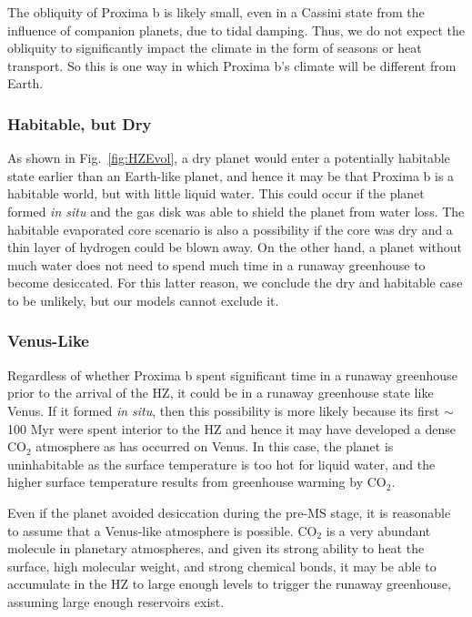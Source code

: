 \documentclass[preprint,12pt]{aastex}
\begin{document}
The obliquity of Proxima b is likely small, even in a Cassini state 
from the influence of companion
planets, due to tidal damping. Thus, we do not expect the 
obliquity to significantly impact the climate in the form of seasons or heat 
transport. So this is one way in which Proxima b's climate will be 
different from Earth. 

\subsubsection{Habitable, but Dry}

As shown in Fig.~\ref{fig:HZEvol}, a dry planet would enter a
potentially habitable state earlier than an Earth-like planet, and
hence it may be that Proxima b is a habitable world, but with little
liquid water. This could occur if the planet formed {\it in situ} and
the gas disk was able to shield the planet from water loss. The
habitable evaporated core scenario is also a possibility if the core
was dry and a thin layer of hydrogen could be blown away. On the other
hand, a planet without much water does not need to spend much time in
a runaway greenhouse to become desiccated. For this latter reason, we
conclude the dry and habitable case to be unlikely, but our models
cannot exclude it.

\subsubsection{Venus-Like}
\label{sec:results:atmstates:venuslike}

Regardless of whether Proxima b spent significant time in a runaway
greenhouse prior to the arrival of the HZ, it could be in a runaway
greenhouse state like Venus. If it formed {\it in situ}, then this
possibility is more likely because its first $\sim$100 Myr were spent
interior to the HZ and hence it may have developed a dense CO$_2$
atmosphere as has occurred on Venus. In this case, the planet is
uninhabitable as the surface temperature is too hot for liquid water,
and the higher surface temperature results from greenhouse warming by
CO$_2$.

Even if the planet avoided desiccation during the pre-MS stage, it is
reasonable to assume that a Venus-like atmosphere is possible. CO$_2$
is a very abundant molecule in planetary atmospheres, and given its
strong ability to heat the surface, high molecular weight, and strong
chemical bonds, it may be able to accumulate in the HZ to large enough
levels to trigger the runaway greenhouse, assuming large enough
reservoirs exist.
\end{document}

